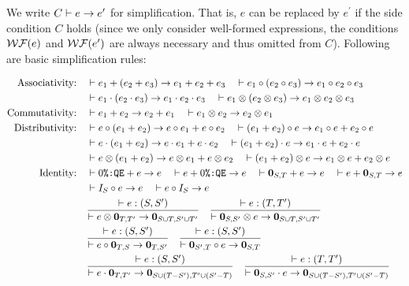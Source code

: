 \begin{definition}[simplification]
	We write $C\vdash e\rightarrow e^\prime$ for simplification. That is, $e$ can be replaced by $e^\prime$ if the side condition $C$ holds (since we only consider well-formed expressions, the conditions ${\mathcal{WF}}(e)$ and ${\mathcal{WF}}(e^\prime)$ are always necessary and thus omitted from $C$). 
	Following are basic simplification rules:
\end{definition}
\begin{align*}
	\text{Associativity:}\quad
	&\vdash e_1 + (e_2 + e_3) \ra e_1 + e_2 + e_3 \quad
	\vdash e_1 \circ (e_2 \circ e_3) \ra e_1 \circ e_2 \circ e_3 \\
	&\vdash e_1 \cdot (e_2 \cdot e_3) \ra e_1 \cdot e_2 \cdot e_3 \quad
	\vdash e_1 \otimes (e_2 \otimes e_3) \ra e_1 \otimes e_2 \otimes e_3\\
	\text{Commutativity:}\quad
	&\vdash e_1 + e_2 \ra e_2 + e_1 \quad
	\vdash e_1 \otimes e_2 \ra e_2 \otimes e_1 \\
	\text{Distributivity:}\quad
	&\vdash e \circ (e_1 + e_2) \ra e \circ e_1 + e \circ e_2\quad
	\vdash (e_1 + e_2) \circ e \ra e_1 \circ e + e_2 \circ e\\
	&\vdash e \cdot (e_1 + e_2) \ra e \cdot e_1 + e \cdot e_2\quad
	\vdash (e_1 + e_2)\cdot e \ra e_1 \cdot e + e_2 \cdot e\\
	&\vdash e \otimes (e_1 + e_2) \ra e \otimes e_1 + e \otimes e_2\quad
	\vdash (e_1 + e_2) \otimes e \ra e_1 \otimes e + e_2 \otimes e\\
	\text{Identity:}\quad
	&\vdash 0\CtoQE + e \ra e\quad \vdash e + 0\CtoQE \ra e \quad
	\vdash {\bf 0}_{S,T} + e \ra e\quad \vdash e + {\bf 0}_{S,T} \ra e \\
	&\vdash I_S\circ e \ra e\quad \vdash e\circ I_S \ra e\\
	&\frac{\vdash e : (S,S^\prime)}{\vdash e \otimes {\bf 0}_{T,T^\prime} \ra 
		{\bf 0}_{S\cup T,S^\prime\cup T^\prime}}\quad
	\frac{\vdash e : (T,T^\prime)}{\vdash {\bf 0}_{S,S^\prime} \otimes e \ra 
		{\bf 0}_{S\cup T,S^\prime\cup T^\prime}}\\
	&\frac{\vdash e : (S,S^\prime)}{\vdash e \circ {\bf 0}_{T,S} \ra 
		{\bf 0}_{T,S^\prime}}\quad
	\frac{\vdash e : (S,S^\prime)}{\vdash {\bf 0}_{S^\prime,T}\circ e \ra 
		{\bf 0}_{S,T}}\\
	&\frac{\vdash e : (S,S^\prime)}{\vdash e \cdot {\bf 0}_{T,T^\prime} \ra 
		{\bf 0}_{S\cup(T-S^\prime), T^\prime\cup(S^\prime-T)}}\quad
	\frac{\vdash e : (T,T^\prime)}{\vdash {\bf 0}_{S,S^\prime}\cdot e \ra 
		{\bf 0}_{S\cup(T-S^\prime), T^\prime\cup(S^\prime-T)}}\\

\end{align*}
